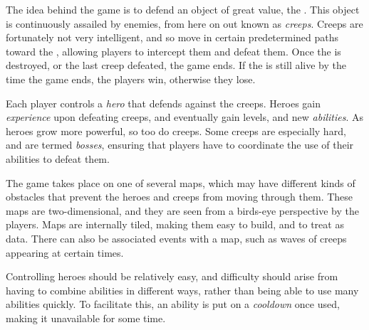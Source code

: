 The idea behind the game is to defend an object of great value, the \objective.
This object is continuously assailed by enemies, from here on out known as \emph{creeps}.
Creeps are fortunately not very intelligent, and so move in certain predetermined
paths toward the \objective, allowing players to intercept them and defeat them.
Once the \objective  is destroyed, or the last creep defeated, the game ends. If
the \objective  is still alive by the time the game ends, the players win, otherwise
they lose.

Each player controls a \emph{hero} that defends against the creeps. Heroes gain
\emph{experience} upon defeating creeps, and eventually gain levels, and new \emph{abilities}.
As heroes grow more powerful, so too do creeps. Some creeps are especially hard, and
are termed \emph{bosses}, ensuring that players have to coordinate the use of their
abilities to defeat them.

The game takes place on one of several maps, which may have different kinds of
obstacles that prevent the heroes and creeps from moving through them. These
maps are two-dimensional, and they are seen from a birds-eye perspective by
the players. Maps are internally tiled, making them easy to build, and to treat
as data. There can also be associated events with a map, such as waves of creeps
appearing at certain times.

Controlling heroes should be relatively easy, and difficulty should arise from
having to combine abilities in different ways, rather than being able to
use many abilities quickly. To facilitate this, an ability is put on a
\emph{cooldown} once used, making it unavailable for some time. 
